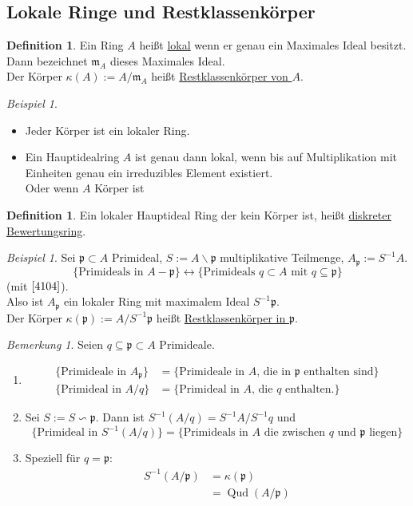 \documentclass[10pt,a4paper]{article}
\newcommand{\Qud}{\operatorname{Qud}}
\newcounter{thm}[section]
\theoremstyle{definition}
\newtheorem{definition}[thm]{Definition}
\theoremstyle{plain}
\theoremstyle{remark}
\newtheorem{bem}[thm]{Bemerkung}
\newtheorem{exm}[thm]{Beispiel}
\begin{document}
\subsection{Lokale Ringe und Restklassenkörper}
\begin{definition}
	Ein Ring $A$ heißt \underline{lokal} wenn er genau ein Maximales Ideal besitzt.\\
	Dann bezeichnet $\mathfrak m_A$ dieses Maximales Ideal.\\
	Der Körper $\kappa(A):=A/\mathfrak m_A$ heißt \underline{Restklassenkörper von $A$}.
\end{definition}
\begin{exm}
	\begin{itemize}
		\item Jeder Körper ist ein lokaler Ring.
		\item Ein Hauptidealring $A$ ist genau dann lokal, wenn bis auf Multiplikation mit Einheiten genau ein irreduzibles Element existiert.\\
		Oder wenn $A$ Körper ist
	\end{itemize}
\end{exm}
\begin{definition}
	Ein lokaler Hauptideal Ring der kein Körper ist, heißt \underline{diskreter Bewertungsring}.
\end{definition}
\begin{exm}
	Sei $\mathfrak p\subset A$ Primideal, $S:=A\backslash \mathfrak p$ multiplikative Teilmenge, $A_{\mathfrak p}:=S^{-1}A$.
	\[\{\text{Primideals in $A-\mathfrak p$}\}\leftrightarrow\{\text{Primideals $q\subset A$ mit $q\subseteq \mathfrak p$}\}\]
	(mit $\ref{4104}$).\\ 
	Also ist $A_{\mathfrak p}$ ein lokaler Ring mit maximalem Ideal $S^{-1}\mathfrak p$.\\
	Der Körper $\kappa(\mathfrak p):=A/S^{-1}\mathfrak p$ heißt \underline{Restklassenkörper in $\mathfrak p$}.
\end{exm}
\begin{bem}
	Seien $q\subseteq\mathfrak p\subset A$ Primideale.\begin{enumerate}
		\item \begin{align*}
		\{\text{Primideale in $A_{\mathfrak p}$}\}&=\{\text{Primideale in $A$, die in $\mathfrak p$ enthalten sind}\}\\
		\{\text{Primideal in $A/q$}\}&=\{\text{Primideal in $A$, die $q$ enthalten.}\}
		\end{align*}
		\item  Sei $S:=S\backsim\mathfrak p$. Dann ist $S^{-1}(A/q)=S^{-1} A/S^{-1}q$ und
		\[\{\text{Primideal in $S^{-1}(A/q)$}\}=\{\text{Primideals in $A$ die zwischen $q$ und $\mathfrak p$ liegen}\}\]
		\item Speziell für $q=\mathfrak p$:
		\begin{align*}
		S^{-1}(A/\mathfrak p)&=\kappa(\mathfrak p)\\
		&=\Qud(A/\mathfrak p)
		\end{align*}
	\end{enumerate}
\end{bem}
\end{document}

